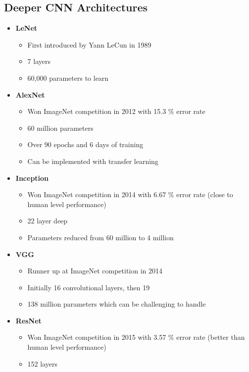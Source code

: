 \documentclass[11pt]{article}
\begin{document}
\subsection{Deeper CNN Architectures}
\begin{itemize}
\item \textbf{LeNet}
\begin{itemize}
\item First introduced by Yann LeCun in 1989
\item 7 layers
\item 60,000 parameters to learn
\end{itemize}
\item \textbf{AlexNet}
\begin{itemize}
\item Won ImageNet competition in 2012 with 15.3 \% error rate
\item 60 million parameters
\item Over 90 epochs and 6 days of training
\item Can be implemented with transfer learning
\end{itemize}
\item \textbf{Inception}
\begin{itemize}
\item Won ImageNet competition in 2014 with 6.67 \% error rate (close to human level performance)
\item 22 layer deep
\item Parameters reduced from 60 million to 4 million
\end{itemize}
\item \textbf{VGG} 
\begin{itemize}
\item Runner up at ImageNet competition in 2014
\item Initially 16 convolutional layers, then 19
\item 138 million parameters which can be challenging to handle
\end{itemize}
\item \textbf{ResNet}
\begin{itemize}
\item Won ImageNet competition in 2015 with 3.57 \% error rate (better than human level performance)
\item 152 layers
\end{itemize}
\end{itemize}
\end{document}
